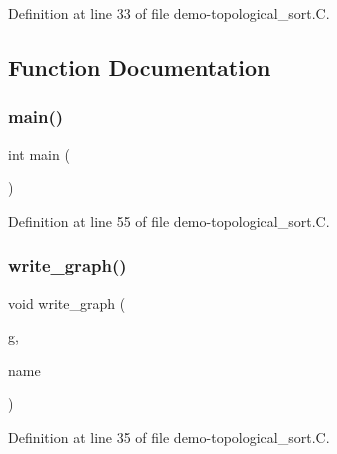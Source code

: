 Definition at line 33 of file demo-\/topological\+\_\+sort.\+C.



\subsection{Function Documentation}
\mbox{\label{demo-topological__sort_8_c_ae66f6b31b5ad750f1fe042a706a4e3d4}} 
\subsubsection{\texorpdfstring{main()}{main()}}
{\footnotesize\ttfamily int main (\begin{DoxyParamCaption}{ }\end{DoxyParamCaption})}



Definition at line 55 of file demo-\/topological\+\_\+sort.\+C.

\mbox{\label{demo-topological__sort_8_c_ab82a33da73b0e5278780967809b0791d}} 
\subsubsection{\texorpdfstring{write\+\_\+graph()}{write\_graph()}}
{\footnotesize\ttfamily void write\+\_\+graph (\begin{DoxyParamCaption}\item[{\hyperlink{demo-buildgraph_8_c_ae73e956c2a8cf0a58255aa6b659985e0}{D\+GT} \&}]{g,  }\item[{const char $\ast$}]{name }\end{DoxyParamCaption})}



Definition at line 35 of file demo-\/topological\+\_\+sort.\+C.

